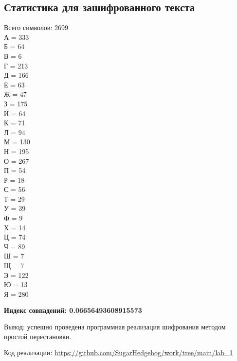 \documentclass[a4paper, 14pt]{extarticle}
\begin{document}
\subsection{Статистика для зашифрованного текста}

Всего символов: 2699\\

\noindent А = 333
\\Б = 64
\\В = 6
\\Г = 213
\\Д = 166
\\Е = 63
\\Ж = 47
\\З = 175
\\И = 64
\\К = 71
\\Л = 94
\\М = 130
\\Н = 195
\\О = 267
\\П = 54
\\Р = 18
\\С = 56
\\Т = 29
\\У = 39
\\Ф = 9
\\Х = 14
\\Ц = 74
\\Ч = 89
\\Ш = 7
\\Щ = 7
\\Э = 122
\\Ю = 13
\\Я = 280

\textbf{Индекс совпадений: 0.06656493608915573}


Вывод:  успешно проведена программная реализация шифрования методом простой перестановки.

Код реализации: \url{https://github.com/SugarHedgehog/work/tree/main/lab_1}
\end{document}
